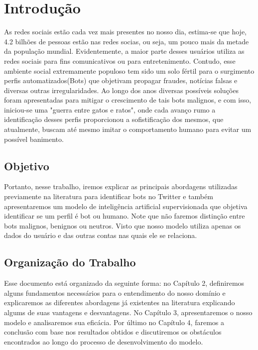 \chapter{Introdução}\label{chp:INTRODUCAO}

As redes sociais estão cada vez mais presentes no nosso dia, estima-se que hoje, 4.2 bilhões de pessoas estão nas redes socias, ou seja, um pouco mais da metade da população mundial. 
Evidentemente, a maior parte desses usuários utiliza as redes sociais para fins comunicativos ou para entretenimento. Contudo, esse ambiente social extremamente populoso tem sido um solo fértil para o surgimento perfis automatizados(Bots) que objetivam propagar fraudes, notícias falsas e diversas outras irregularidades. 
Ao longo dos anos diversas possíveis soluções foram apresentadas para mitigar o crescimento de tais bots malignos, e com isso, iniciou-se uma "guerra entre gatos e ratos", onde cada avanço rumo a identificação desses perfis proporcionou a sofistificação dos mesmos, que atualmente, buscam até mesmo imitar o comportamento humano para evitar um possível banimento.


\section{Objetivo}

Portanto, nesse trabalho, iremos explicar as principais abordagens utilizadas previamente na literatura para identificar bots no Twitter e também apresentaremos um modelo de inteligência artificial supervisionada que objetiva identificar se um perfil é bot ou humano. Note que não faremos distinção entre bots malignos, benignos ou neutros. Visto que nosso modelo utiliza apenas os dados do usuário e das outras contas nas quais ele se relaciona. 

\section{Organização do Trabalho}

Esse documento está organizado da seguinte forma: no Capítulo 2, definiremos alguns fundamentos necessários para o entendimento do nosso domínio e explicaremos as diferentes abordagens já existentes na literatura explicando algums de suas vantagens e desvantagens. No Capítulo 3, apresentaremos o nosso modelo e analisaremos sua eficácia. Por último no Capítulo 4, faremos a conclusão com base nos resultados obtidos e discutiremos os obstáculos encontrados ao longo do processo de desenvolvimento do modelo.